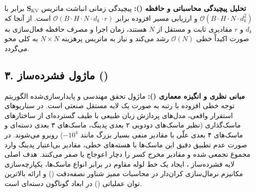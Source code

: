 \textbf{تحلیل پیچیدگی محاسباتی و حافظه ():}
پیچیدگی زمانی انباشت ماتریس $\mathbf{S}_{\text{KV}}$ برابر با $\mathcal{O}(B \cdot H \cdot N \cdot d_k^2)$ و ارزیابی مسیر افزوده برابر $\mathcal{O}(B \cdot H \cdot N \cdot d_k \cdot r)$ است. از آنجا که $d_k$ و $r$ مقادیری ثابت و مستقل از $N$ هستند، زمان اجرا و مصرف حافظه فعال‌سازی به صورت اکیداً خطی $\mathcal{O}(N)$ رشد می‌کند و نیاز به ماتریس پرهزینه $N \times N$ به کلی محو می‌گردد.



\subsection*{۳. ماژول فشرده‌ساز  ()}

\textbf{مبانی نظری و انگیزه معماری ():}
ماژول  تحقق مهندسی و پایدارسازی‌شده الگوریتم توجه خطی افزوده با رتبه به صورت یک لایه مستقل صنعتی است. در سناریوهای استقرار واقعی، مدل‌های پردازش زبان طبیعی با طیف گسترده‌ای از ساختارهای ماسک‌گذاری (نظیر ماسک‌های دودویی ۲ بعدی پدینگ، ماسک‌های ۳ بعدی دسته‌ای و ماسک‌های ۴ بعدی علّی با مقادیر منفی بسیار بزرگ مانند $-10^4$) روبرو می‌شوند. در صورت عدم تطبیق دقیق این ماسک‌ها با هسته‌های خطی، مقادیر بی‌اعتبار پدینگ وارد مجموع تجمعی شده و مقادیر مخرج کسر را دچار اعوجاج یا صفر می‌کنند.
هدف اصلی لایه فشرده‌ساز ، ایجاد یک خط لوله مقاوم در برابر انواع ماسک‌ها، یکپارچه‌سازی مکانیزم نرمال‌سازی کران‌دار در محاسبات ممیز شناور نصفه‌دقت () و ارائه بالاترین توان عملیاتی () در ابعاد گوناگون دسته‌ای است.

